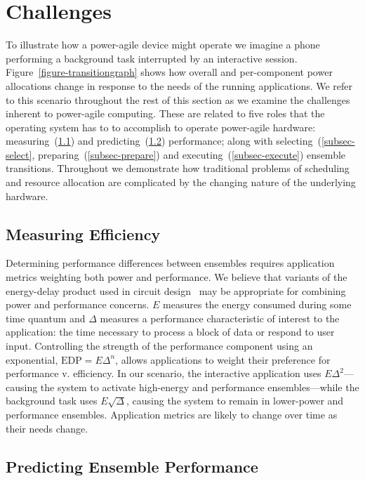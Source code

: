 \section{Challenges}
\label{sec-challenges}



To illustrate how a power-agile device might operate we imagine a phone
performing a background task interrupted by an interactive session.
Figure~\ref{figure-transitiongraph} shows how overall and per-component power
allocations change in response to the needs of the running applications. We
refer to this scenario throughout the rest of this section as we examine the
challenges inherent to power-agile computing. These are related to five roles
that the operating system has to to accomplish to operate power-agile
hardware: measuring~(\ref{subsec-measure}) and
predicting~(\ref{subsec-predict}) performance; along with
selecting~(\ref{subsec-select}, preparing~(\ref{subsec-prepare}) and
executing~(\ref{subsec-execute}) ensemble transitions. Throughout we
demonstrate how traditional problems of scheduling and resource allocation
are complicated by the changing nature of the underlying hardware.

\subsection{Measuring Efficiency}
\label{subsec-measure}

Determining performance differences between ensembles requires application
metrics weighting both power and performance. We believe that variants of the
energy-delay product used in circuit design~\cite{martin-et2} may be
appropriate for combining power and performance concerns. $E$ measures the
energy consumed during some time quantum and $\Delta$ measures a performance
characteristic of interest to the application: the time necessary to process
a block of data or respond to user input. Controlling the strength of the
performance component using an exponential, $\textrm{EDP} = E\Delta^n$,
allows applications to weight their preference for performance v.
efficiency. In our scenario, the interactive application uses
$E\Delta^2$---causing the system to activate high-energy and performance
ensembles---while the background task uses $E\sqrt{\Delta}$, causing the
system to remain in lower-power and performance ensembles. Application
metrics are likely to change over time as their needs change.

\subsection{Predicting Ensemble Performance}
\label{subsec-predict}

